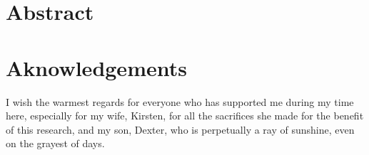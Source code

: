 \chapter*{Abstract}

\newpage





\listoftodos
\todototoc


\chapter{Aknowledgements}
I wish the warmest regards for everyone who has supported me during my time here, especially for my wife, Kirsten, for all the sacrifices she made for the benefit of this research, and my son, Dexter, who is perpetually a ray of sunshine, even on the grayest of days.


\printnomenclature
\tableofcontents
\listoffigures
\listofalgorithms

